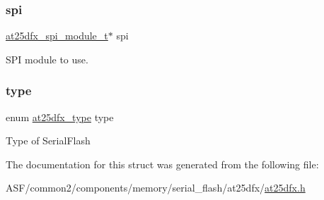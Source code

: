 \subsubsection{\texorpdfstring{spi}{spi}}
{\footnotesize\ttfamily \mbox{\hyperlink{group__asfdoc__common2__at25dfx__group_ga78981ccb6b863d6548f343fe01792406}{at25dfx\+\_\+spi\+\_\+module\+\_\+t}}$\ast$ spi}

S\+PI module to use. \mbox{\label{structat25dfx__chip__module_a71bd7aaba8d2006d07410e3ee92755db}} 
\subsubsection{\texorpdfstring{type}{type}}
{\footnotesize\ttfamily enum \mbox{\hyperlink{group__asfdoc__common2__at25dfx__group_ga98ba30dd90f741beb7f8d47e7725471d}{at25dfx\+\_\+type}} type}

Type of Serial\+Flash 

The documentation for this struct was generated from the following file\+:\begin{DoxyCompactItemize}
\item 
A\+S\+F/common2/components/memory/serial\+\_\+flash/at25dfx/\mbox{\hyperlink{at25dfx_8h}{at25dfx.\+h}}\end{DoxyCompactItemize}
